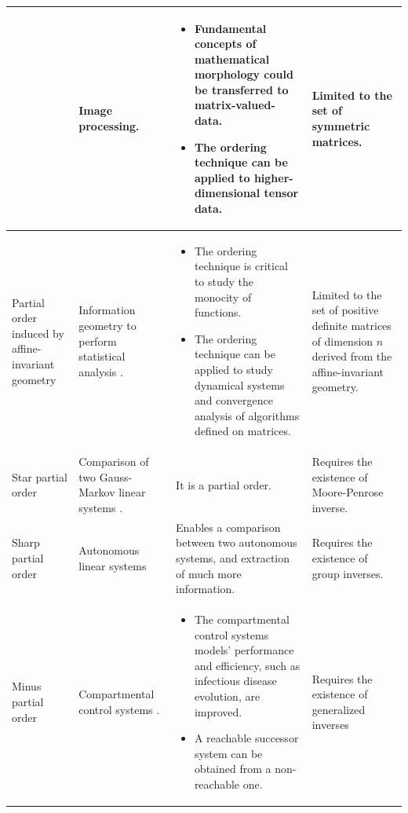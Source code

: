 \documentclass[journal,article,submit,moreauthors,pdftex]{Definitions/mdpi}
\begin{document}
\begin{paracol}{1}
\begin{longtable}{p{2cm}L{3.9cm}L{3.9cm}L{3.9cm}}
        & Image processing. \cite{Burgeth2005a,Burgeth2006,Burgeth2007} & \begin{itemize}[leftmargin=*]
            \item Fundamental concepts of mathematical morphology could be transferred to matrix-valued-data.
            \item The ordering technique can be applied to higher-dimensional tensor data.
        \end{itemize} & Limited to the set of symmetric matrices. \\
        \hline
        Partial order induced by affine-invariant geometry & Information geometry to perform statistical analysis \cite{Mostajeran2018}. & \begin{itemize}[leftmargin=*]
            \item The ordering technique is critical to study the monocity of functions.
            \item The ordering technique can be applied to study dynamical systems and convergence analysis of algorithms defined on matrices.
        \end{itemize} & Limited to the set of positive definite matrices of dimension $n$ derived from the affine-invariant geometry.   \\
        \hline
        Star partial order & Comparison of two Gauss-Markov linear systems \cite{Mitra2010,Dolinar2020}. & It is a partial order. & Requires the existence of Moore-Penrose inverse.    \\
        \hline
        Sharp partial order & Autonomous linear systems \cite{Coll2017,Herrero2020} & Enables a comparison between two autonomous systems, and extraction of much more information. & Requires the existence of group inverses. \\
        \hline
        Minus partial order & Compartmental control systems \cite{Coll2020b}. & \begin{itemize}[leftmargin=*]
            \item The compartmental control systems models' performance and efficiency, such as infectious disease evolution, are improved.
            \item A reachable successor system can be obtained from a non-reachable one. 
        \end{itemize} & Requires the existence of generalized inverses
    \end{longtable} 
\end{paracol}%
\end{document}
